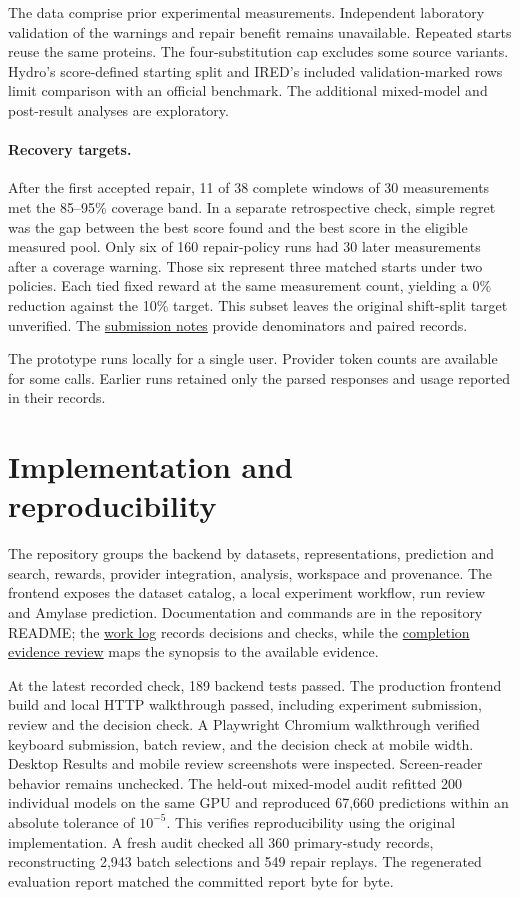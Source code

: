 \documentclass[11pt,a4paper]{article}
\begin{document}
The data comprise prior experimental measurements. Independent laboratory validation of the warnings and repair benefit remains unavailable. Repeated starts reuse the same proteins. The four-substitution cap excludes some source variants. Hydro's score-defined starting split and IRED's included validation-marked rows limit comparison with an official benchmark. The additional mixed-model and post-result analyses are exploratory.

\paragraph{Recovery targets.} After the first accepted repair, 11 of 38 complete windows of 30 measurements met the 85--95\% coverage band. In a separate retrospective check, simple regret was the gap between the best score found and the best score in the eligible measured pool. Only six of 160 repair-policy runs had 30 later measurements after a coverage warning. Those six represent three matched starts under two policies. Each tied fixed reward at the same measurement count, yielding a 0\% reduction against the 10\% target. This subset leaves the original shift-split target unverified. The \href{../../research/submission_readiness.md}{submission notes} provide denominators and paired records.

The prototype runs locally for a single user. Provider token counts are available for some calls. Earlier runs retained only the parsed responses and usage reported in their records.

\section{Implementation and reproducibility}
The repository groups the backend by datasets, representations, prediction and search, rewards, provider integration, analysis, workspace and provenance. The frontend exposes the dataset catalog, a local experiment workflow, run review and Amylase prediction. Documentation and commands are in the repository README; the \href{../../research/project_decisions_and_work_log.md}{work log} records decisions and checks, while the \href{../../research/completion_evidence_review.md}{completion evidence review} maps the synopsis to the available evidence.

At the latest recorded check, 189 backend tests passed. The production frontend build and local HTTP walkthrough passed, including experiment submission, review and the decision check. A Playwright Chromium walkthrough verified keyboard submission, batch review, and the decision check at mobile width. Desktop Results and mobile review screenshots were inspected. Screen-reader behavior remains unchecked. The held-out mixed-model audit refitted 200 individual models on the same GPU and reproduced 67,660 predictions within an absolute tolerance of $10^{-5}$. This verifies reproducibility using the original implementation. A fresh audit checked all 360 primary-study records, reconstructing 2,943 batch selections and 549 repair replays. The regenerated evaluation report matched the committed report byte for byte.
\end{document}
